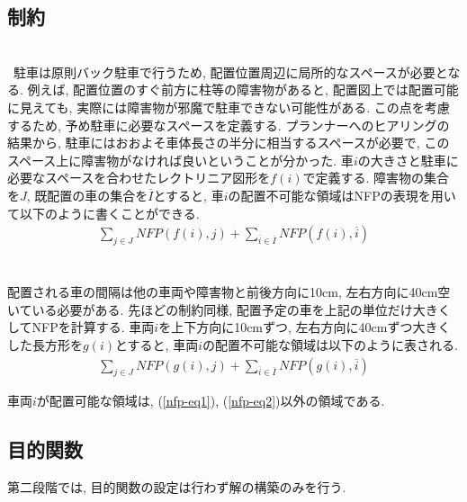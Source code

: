 \subsection{制約}
\\
\ 駐車は原則バック駐車で行うため, 配置位置周辺に局所的なスペースが必要となる. 
例えば, 配置位置のすぐ前方に柱等の障害物があると, 配置図上では配置可能に見えても, 実際には障害物が邪魔で駐車できない可能性がある.
この点を考慮するため, 予め駐車に必要なスペースを定義する.
プランナーへのヒアリングの結果から, 駐車にはおおよそ車体長さの半分に相当するスペースが必要で, このスペース上に障害物がなければ良いということが分かった. 
車$i$の大きさと駐車に必要なスペースを合わせたレクトリニア図形を$f(i)$で定義する. 
障害物の集合を$J$, 既配置の車の集合を$\overline{I}$とすると, 車$i$の配置不可能な領域はNFPの表現を用いて以下のように書くことができる.  
\begin{eqnarray}
    \label{nfp-eq1}
    \sum_{j \in J} NFP(f(i),j) + \sum_{\overline{i} \in \overline{I}} NFP(f(i),\overline{i})
\end{eqnarray}\\

\\
配置される車の間隔は他の車両や障害物と前後方向に10cm, 左右方向に40cm空いている必要がある. 
先ほどの制約同様, 配置予定の車を上記の単位だけ大きくしてNFPを計算する. 
車両$i$を上下方向に10cmずつ, 左右方向に40cmずつ大きくした長方形を$g(i)$とすると, 車両$i$の配置不可能な領域は以下のように表される. 
\begin{eqnarray}
    \label{nfp-eq2}
    \sum_{j \in J} NFP(g(i),j) + \sum_{\overline{i} \in \overline{I}} NFP(g(i),\overline{i})
\end{eqnarray}

車両$i$が配置可能な領域は, (\ref{nfp-eq1}), (\ref{nfp-eq2})以外の領域である. 

\subsection{目的関数}
第二段階では, 目的関数の設定は行わず解の構築のみを行う. 

